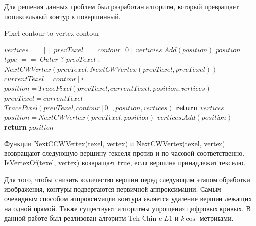 \documentclass{fefu_thesis/cls/fefu}
\newenvironment{algo}[1][]
  {\begin{algorithm}[#1]
     \selectlanguage{english}
     \floatname{algorithm}{Алгоритм}
  }
  {\end{algorithm}}
\begin{document}
    Для решения данных проблем был разработан алгоритм, который превращает попиксельный контур в повершинный.
    \begin{algo}[H]
        \caption{Pixel contour to vertex contour}
        \begin{algorithmic}[1]
                \State $vertices$ $=$ $[]$
                \State $prevTexel$ $=$ $contour$$[0]$
                    \State $verticies.Add(position)$
                \EndIf
                \State $position$ $=$ $type$ $==$ $Outer$ $?$
                \State $prevTexel$ $:$
                \State $NextCWVertex(prevTexel, NextCWVertex(prevTexel, prevTexel))$
                    \State $currentTexel = contour[i]$
                    \State $position = TracePixel(prevTexel, currentTexel, position, vertices)$
                    \State $prevTexel = currentTexel$
                \EndFor
                \State $TracePixel(prevTexel, contour[0], position, vertices)$
                \State \textbf{return} $vertices$
            \EndProcedure
                \Do
                    \State $position = NextCWVertex(prevTexel, position)$
                    \State $vertices.Add(position)$
                \State \textbf{return} $position$
            \EndProcedure
        \end{algorithmic}
    \end{algo}

    Функции NextCCWVertex(texel, vertex) и NextCWVertex(texel, vertex) возвращают следующую вершину текселя против и по часовой соответственно. IsVertexOf(texel, vertex) возвращает true, если вершина принадлежит текселю.

    Для того, чтобы снизить количество вершин перед следующим этапом обработки изображения, контуры подвергаются первичной аппроксимации. Самым очевидным способом аппроксимации контура является удаление вершин лежащих на одной прямой. Также существуют алгоритмы упрощения цифровых кривых. В данной работе был реализован алгоритм Teh-Chin\cite{TehChin} c $L1$ и $k\cos$ метриками.
    \newpage
    
    
\end{document}
